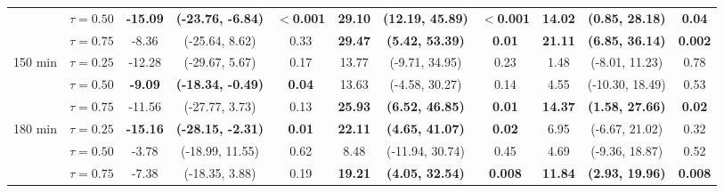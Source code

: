 \begin{table}[ht]
{\begin{tabular}{llccccccccc}
 & $\tau=0.50$ & \textbf{-15.09} & \textbf{(-23.76, -6.84)} & \textbf{$<$0.001} & \textbf{29.10} & \textbf{(12.19, 45.89)} & \textbf{$<$0.001} & \textbf{14.02} & \textbf{(0.85, 28.18)} & \textbf{0.04} \\
 & $\tau=0.75$ & -8.36 & (-25.64, 8.62) & 0.33 & \textbf{29.47} & \textbf{(5.42, 53.39)} & \textbf{0.01} & \textbf{21.11} & \textbf{(6.85, 36.14)} & \textbf{0.002} \\
\midrule
\multirow{3}{*}{150 min} & $\tau=0.25$ & -12.28 & (-29.67, 5.67) & 0.17 & 13.77 & (-9.71, 34.95) & 0.23 & 1.48 & (-8.01, 11.23) & 0.78 \\
 & $\tau=0.50$ & \textbf{-9.09} & \textbf{(-18.34, -0.49)} & \textbf{0.04} & 13.63 & (-4.58, 30.27) & 0.14 & 4.55 & (-10.30, 18.49) & 0.53 \\
 & $\tau=0.75$ & -11.56 & (-27.77, 3.73) & 0.13 & \textbf{25.93} & \textbf{(6.52, 46.85)} & \textbf{0.01} & \textbf{14.37} & \textbf{(1.58, 27.66)} & \textbf{0.02} \\
\midrule
\multirow{3}{*}{180 min} & $\tau=0.25$ & \textbf{-15.16} & \textbf{(-28.15, -2.31)} & \textbf{0.01} & \textbf{22.11} & \textbf{(4.65, 41.07)} & \textbf{0.02} & 6.95 & (-6.67, 21.02) & 0.32 \\
 & $\tau=0.50$ & -3.78 & (-18.99, 11.55) & 0.62 & 8.48 & (-11.94, 30.74) & 0.45 & 4.69 & (-9.36, 18.87) & 0.52 \\
 & $\tau=0.75$ & -7.38 & (-18.35, 3.88) & 0.19 & \textbf{19.21} & \textbf{(4.05, 32.54)} & \textbf{0.008} & \textbf{11.84} & \textbf{(2.93, 19.96)} & \textbf{0.008} \\
\bottomrule
\end{tabular}%
}
\end{table}
